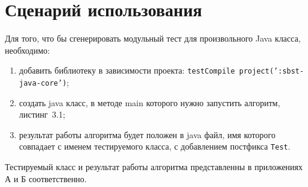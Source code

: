 \section{Сценарий использования}

Для того, что бы сгенерировать модульный тест для произвольного Java класса, необходимо:

\begin{enumerate}
	\item добавить библиотеку в зависимости проекта: \texttt{testCompile project(':sbst-java-core')};
	\item создать java класс, в методе main которого нужно запустить алгоритм, листинг~3.1;
	\item результат работы алгоритма будет положен в java файл, имя которого совпадает с именем тестируемого класса, с добавлением постфикса \texttt{Test}. 
\end{enumerate}

Тестируемый класс и результат работы алгоритма представленны в приложениях А и Б соответственно.
